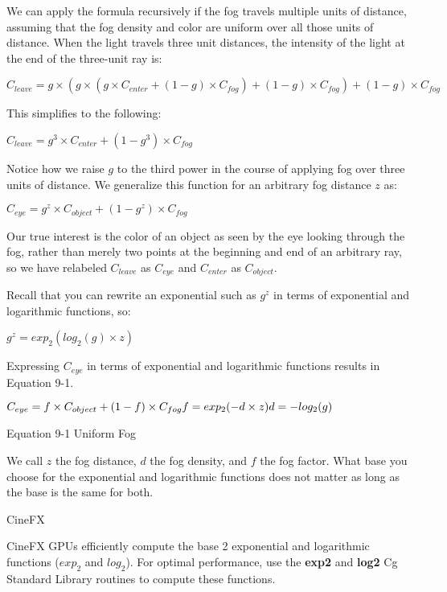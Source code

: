 \documentclass[../main.tex]{subfiles}
\begin{document}
We can apply the formula recursively if the fog travels multiple units of distance, assuming that the fog density and color are uniform over all those units of distance. When the light travels three unit distances, the intensity of the light at the end of the three-unit ray is:

\FloatBarrier
$
C_{leave}=g\times (g\times (g\times C_{enter}+(1-g)\times C_{fog})+(1-g)\times C_{fog})+(1-g)\times C_{fog}
$
\FloatBarrier

This simplifies to the following:

\FloatBarrier
$
C_{leave}=g^3\times C_{enter}+(1-g^3)\times C_{fog}
$
\FloatBarrier

Notice how we raise $g$ to the third power in the course of applying fog over three units of distance. We generalize this function for an arbitrary fog distance $z$ as:

\FloatBarrier
$
C_{eye}=g^z\times C_{object}+(1-g^z)\times C_{fog}
$
\FloatBarrier

Our true interest is the color of an object as seen by the eye looking through the fog, rather than merely two points at the beginning and end of an arbitrary ray, so we have relabeled $C_{leave}$ as $C_{eye}$ and $C_{enter}$ as $C_{object}$.

Recall that you can rewrite an exponential such as $g^z$ in terms of exponential and logarithmic functions, so:

\FloatBarrier
$
g^z=exp_2(log_2(g)\times z)
$
\FloatBarrier

Expressing $C_{eye}$ in terms of exponential and logarithmic functions results in Equation 9-1.

\FloatBarrier
\begin{equationcaption}
$
C_{eye}=f\times C_{object}+(1-f)\times C_{fog} \newline
f=exp_2(-d\times z) \newline
d=-log_2(g)
$
\caption{Equation 9-1 Uniform Fog}
\end{equationcaption}
\FloatBarrier

We call $z$ the fog distance, $d$ the fog density, and $f$ the fog factor. What base you choose for the exponential and logarithmic functions does not matter as long as the base is the same for both.

\begin{framed}
CineFX

CineFX GPUs efficiently compute the base 2 exponential and logarithmic functions ($exp_2$ and $log_2$). For optimal performance, use the \textbf{exp2} and \textbf{log2} Cg Standard Library routines to compute these functions.
\end{framed}
\end{document}
